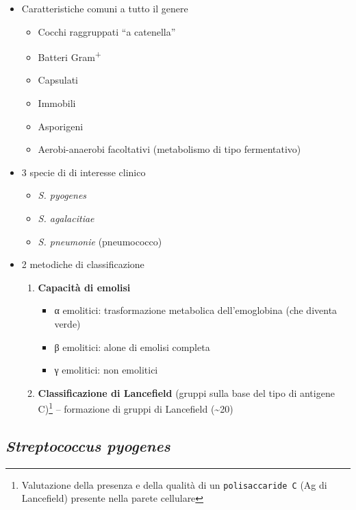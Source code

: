 \documentclass[italian,]{article}
\providecommand{\tightlist}{%
  \setlength{\itemsep}{0pt}\setlength{\parskip}{0pt}}
\begin{document}
\begin{itemize}
\tightlist
\item
  Caratteristiche comuni a tutto il genere

  \begin{itemize}
  \tightlist
  \item
    Cocchi raggruppati ``a catenella''
  \item
    Batteri Gram\textsuperscript{+}
  \item
    Capsulati
  \item
    Immobili
  \item
    Asporigeni
  \item
    Aerobi-anaerobi facoltativi (metabolismo di tipo fermentativo)
  \end{itemize}
\item
  3 specie di di interesse clinico

  \begin{itemize}
  \tightlist
  \item
    \emph{S. pyogenes}
  \item
    \emph{S. agalacitiae}
  \item
    \emph{S. pneumonie} (pneumococco)
  \end{itemize}
\item
  2 metodiche di classificazione

  \begin{enumerate}
  \def\labelenumi{\arabic{enumi}.}
  \tightlist
  \item
    \textbf{Capacità di emolisi}

    \begin{itemize}
    \tightlist
    \item
      α emolitici: trasformazione metabolica dell'emoglobina (che
      diventa verde)
    \item
      β emolitici: alone di emolisi completa
    \item
      γ emolitici: non emolitici
    \end{itemize}
  \item
    \textbf{Classificazione di Lancefield} (gruppi sulla base del tipo
    di antigene C)\footnote{Valutazione della presenza e della qualità
      di un \texttt{polisaccaride\ C} (Ag di Lancefield) presente nella
      parete cellulare} -- formazione di gruppi di Lancefield
    (\textasciitilde{}20)
  \end{enumerate}
\end{itemize}

\hypertarget{streptococcus-pyogenes}{%
\subsection{\texorpdfstring{\emph{Streptococcus
pyogenes}}{Streptococcus pyogenes}}\label{streptococcus-pyogenes}}
\end{document}

